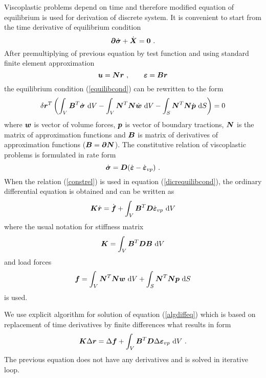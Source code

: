 Viscoplastic problems depend on time and therefore modified equation of equilibrium
is used for derivation of discrete system. It is convenient to start from the time derivative
of equilibrium condition
\begin{equation}\label{equilibcond}
\mbox{\boldmath$\partial$} \dot{\mbox{\boldmath$\sigma$}} + \dot{\mbox{\boldmath$X$}} = \mbox{\boldmath$0$} \ .
\end{equation}
After premultiplying of previous equation by test function and using standard finite
element approximation
\begin{equation}\label{femappr}
\mbox{\boldmath$u$}=\mbox{\boldmath$N$} \mbox{\boldmath$r$}\ , \ \ \ \ \ \
\mbox{\boldmath$\varepsilon$} = \mbox{\boldmath$B$} \mbox{\boldmath$r$}
\end{equation}
the equilibrium condition (\ref{equilibcond}) can be rewritten to the form
\begin{equation}\label{dicrequilibcond}
\delta \mbox{\boldmath$r$}^T \left(\int_{V} \mbox{\boldmath$B$}^T \dot{\mbox{\boldmath$\sigma$}}\ {\rm d}V -
\int_{V} \mbox{\boldmath$N$}^T \mbox{\boldmath$N$} \dot{\mbox{\boldmath$w$}}\ {\rm d}V -
\int_{S} \mbox{\boldmath$N$}^T \mbox{\boldmath$N$} \dot{\mbox{\boldmath$p$}}\ {\rm d}S
\right)=0
\end{equation}
where $\mbox{\boldmath$w$}$ is vector of volume forces, $\mbox{\boldmath$p$}$ is vector of boundary tractions,
$\mbox{\boldmath$N$}$ is the matrix of approximation functions and $\mbox{\boldmath$B$}$ is matrix of derivatives
of approximation functions ($\mbox{\boldmath$B$}=\mbox{\boldmath$\partial$}\mbox{\boldmath$N$}$). The constitutive relation
of viscoplastic problems is formulated in rate form
\begin{equation}\label{constrel}
\dot{\mbox{\boldmath$\sigma$}} = \mbox{\boldmath$D$} (\dot{\mbox{\boldmath$\varepsilon$}} - \dot{\mbox{\boldmath$\varepsilon$}}_{vp}) \ .
\end{equation}
When the relation (\ref{constrel}) is used in equation (\ref{dicrequilibcond}), the
ordinary differential equation is obtained and can be written as
\begin{equation}\label{algdiffeq}
\mbox{\boldmath$K$} \dot{\mbox{\boldmath$r$}} = \dot{\mbox{\boldmath$f$}} +
\int_{V} \mbox{\boldmath$B$}^T \mbox{\boldmath$D$} \dot{\mbox{\boldmath$\varepsilon$}}_{vp}\ {\rm d}V
\end{equation}
where the usual notation for stiffness matrix
\begin{equation}
\mbf{K} = \int_{V} \mbf{B}^T \mbf{D} \mbf{B}\ {\rm d}V
\end{equation}
and load forces
\begin{equation}
\mbox{\boldmath$f$}=\int_{V} \mbox{\boldmath$N$}^T \mbox{\boldmath$N$} \mbox{\boldmath$w$}\ {\rm d}V +
\int_{S} \mbox{\boldmath$N$}^T \mbox{\boldmath$N$} \mbox{\boldmath$p$}\ {\rm d}S
\end{equation}
is used.

We use explicit algorithm for solution of equation (\ref{algdiffeq}) which is based on
replacement of time derivatives by finite differences what results in form
\begin{equation}\label{fullydiscr}
\mbox{\boldmath$K$} \Delta \mbox{\boldmath$r$} = \Delta \mbox{\boldmath$f$} + \int_{V} \mbox{\boldmath$B$}^T \mbox{\boldmath$D$} \Delta \mbox{\boldmath$\varepsilon$}_{vp}\ {\rm d}V \ .
\end{equation}
The previous equation does not have any derivatives and is solved in iterative loop.

